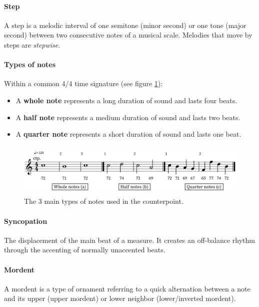 \paragraph{Step} A step is a melodic interval of one semitone (minor second) or one tone (major second)\parencite{Step} between two consecutive notes of a musical scale\parencite{Stepswiki}. Melodies that move by steps are \emph{stepwise}.

\paragraph{Types of notes}
Within a common 4/4 time signature (see figure \ref{fig:theorytypesofnotes}):
\begin{multicols}{3}
    \begin{itemize}
        \item A \textbf{whole note} represents a long duration of sound and lasts four beats.
        \item A \textbf{half note} represents a medium duration of sound and lasts two beats.
        \item A \textbf{quarter note} represents a short duration of sound and lasts one beat.
    \end{itemize}
\end{multicols}

\begin{figure}[h]
    \centering
    \includegraphics[height=1in]{Images/melodic_intervals_variables.png}
    \caption{The 3 main types of notes used in the counterpoint.}
    \label{fig:theorytypesofnotes}
\end{figure}

\paragraph{Syncopation} The displacement of the main beat of a measure. It creates an off-balance rhythm through the accenting of normally unaccented beats.

\paragraph{Mordent} A mordent is a type of ornament referring to a quick alternation between a note and its upper (upper mordent) or lower neighbor (lower/inverted mordent)\parencite{Mordent}.

